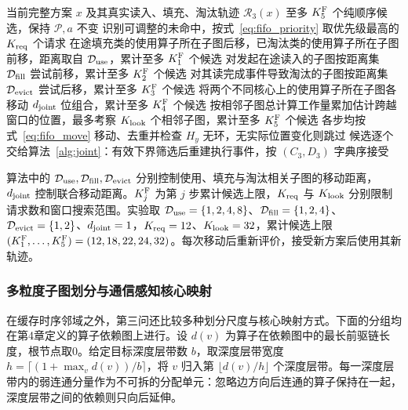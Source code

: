 \begin{algorithm}[htbp]
\caption{FIFO窗口驱动的纯顺序候选生成}\label{alg:fifo}
\small
\begin{algorithmic}[1]
\Require 当前完整方案 $x$ 及其真实读入、填充、淘汰轨迹 $\mathcal R_3(x)$
\Ensure 至多 $K^{\rm F}_5$ 个纯顺序候选，保持 $\mathcal P,a$ 不变
\State 识别可调整的未命中，按式~\eqref{eq:fifo_priority} 取优先级最高的 $K_{\rm req}$ 个请求
\State 在途填充类的使用算子所在子图后移，已淘汰类的使用算子所在子图前移，距离取自 $\mathcal D_{\rm use}$，累计至多 $K^{\rm F}_1$ 个候选
\State 对发起在途读入的子图按距离集 $\mathcal D_{\rm fill}$ 尝试前移，累计至多 $K^{\rm F}_2$ 个候选
\State 对其读完成事件导致淘汰的子图按距离集 $\mathcal D_{\rm evict}$ 尝试后移，累计至多 $K^{\rm F}_3$ 个候选
\State 将两个不同核心上的使用算子所在子图各移动 $d_{\rm joint}$ 位组合，累计至多 $K^{\rm F}_4$ 个候选
\State 按相邻子图总计算工作量累加估计跨越窗口的位置，最多考察 $K_{\rm look}$ 个相邻子图，累计至多 $K^{\rm F}_5$ 个候选
\State 各步均按式~\eqref{eq:fifo_move} 移动、去重并检查 $H_y$ 无环，无实际位置变化则跳过
\State 候选逐个交给算法~\ref{alg:joint}：有效下界筛选后重建执行事件，按 $(C_3,D_3)$ 字典序接受
\end{algorithmic}
\end{algorithm}

算法中的 $\mathcal D_{\rm use},\mathcal D_{\rm fill},\mathcal D_{\rm evict}$ 分别控制使用、填充与淘汰相关子图的移动距离，$d_{\rm joint}$ 控制联合移动距离。$K^{\rm F}_j$ 为第 $j$ 步累计候选上限，$K_{\rm req}$ 与 $K_{\rm look}$ 分别限制请求数和窗口搜索范围。实验取 $\mathcal D_{\rm use}=\{1,2,4,8\}$、$\mathcal D_{\rm fill}=\{1,2,4\}$、$\mathcal D_{\rm evict}=\{1,2\}$、$d_{\rm joint}=1$，$K_{\rm req}=12$、$K_{\rm look}=32$，累计候选上限 $(K^{\rm F}_1,\ldots,K^{\rm F}_5)=(12,18,22,24,32)$。每次移动后重新评价，接受新方案后使用其新轨迹。

\subsubsection{多粒度子图划分与通信感知核心映射}
\label{subsec:q3_portfolio}
在缓存时序邻域之外，第三问还比较多种划分尺度与核心映射方式。下面的分组均在第4章定义的算子依赖图上进行。设 $d(v)$ 为算子在依赖图中的最长前驱链长度，根节点取0。给定目标深度层带数 $b$，取深度层带宽度 $h=\lceil(1+\max_v d(v))/b\rceil$，将 $v$ 归入第 $\lfloor d(v)/h\rfloor$ 个深度层带。每一深度层带内的弱连通分量作为不可拆的分配单元：忽略边方向后连通的算子保持在一起，深度层带之间的依赖则只向后延伸。

